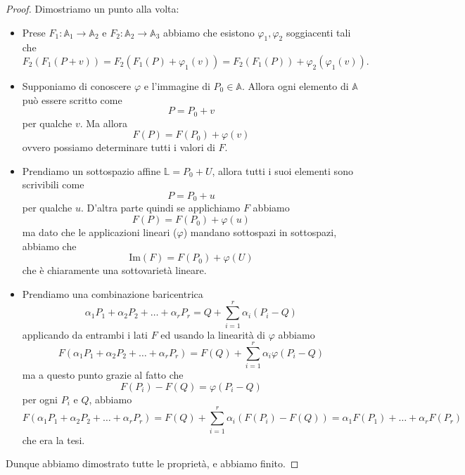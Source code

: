 \documentclass[11pt]{scrartcl}
\newcommand{\Immagine}[1]{\text{Im}\left(#1\right)}
\renewcommand{\AA}{\mathbb{A}}
\newcommand{\LL}{\mathbb{L}}
\begin{document}
   	 \begin{proof}
   	 	Dimostriamo un punto alla volta:
   	 	\begin{itemize}
   	 		\item Prese $F_1:\AA_1\to\AA_2$ e $F_2:\AA_2\to\AA_3$ abbiamo che esistono $\varphi_1,\varphi_2$ soggiacenti tali che
   	 		$$F_2(F_1(P+v))=F_2(F_1(P)+\varphi_1(v))=F_2(F_1(P))+\varphi_2(\varphi_1(v)).$$
   	 		\item Supponiamo di conoscere $\varphi$ e l'immagine di $P_0\in\AA$. Allora ogni elemento di $\AA$ può essere scritto come
   	 		$$P=P_0+v$$
   	 		per qualche $v$. Ma allora
   	 		$$F(P)=F(P_0)+\varphi(v)$$
   	 		ovvero possiamo determinare tutti i valori di $F$.
   	 		\item Prendiamo un sottospazio affine $\LL=P_0+U$, allora tutti i suoi elementi sono scrivibili come
   	 		$$P=P_0+u$$
   	 		per qualche $u$. D'altra parte quindi se applichiamo $F$ abbiamo
   	 		$$F(P)=F(P_0)+\varphi(u)$$
   	 		ma dato che le applicazioni lineari ($\varphi$) mandano sottospazi in sottospazi, abbiamo che 
   	 		$$\Immagine{F}=F(P_0)+\varphi(U)$$
   	 		che è chiaramente una sottovarietà lineare.
   	 		\item Prendiamo una combinazione baricentrica
   	 		$$\alpha_1P_1+\alpha_2P_2+\dots+\alpha_rP_r=Q+\sum_{i=1}^{r}\alpha_i(P_i-Q)$$
   	 		applicando da entrambi i lati $F$ ed usando la linearità di $\varphi$ abbiamo
   	 		$$F(\alpha_1P_1+\alpha_2P_2+\dots+\alpha_rP_r)=F(Q)+\sum_{i=1}^{r}\alpha_i\varphi(P_i-Q)$$
   	 		ma a questo punto grazie al fatto che
   	 		$$F(P_i)-F(Q)=\varphi(P_i-Q)$$
   	 		per ogni $P_i$ e $Q$, abbiamo
   	 		$$F(\alpha_1P_1+\alpha_2P_2+\dots+\alpha_rP_r)=F(Q)+\sum_{i=1}^{r}\alpha_i(F(P_i)-F(Q))=\alpha_1F(P_1)+\dots+\alpha_rF(P_r)$$
   	 		che era la tesi.
   	 	\end{itemize}
   	 	Dunque abbiamo dimostrato tutte le proprietà, e abbiamo finito. 
   	 \end{proof}
\end{document}
